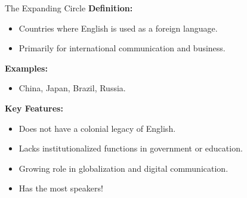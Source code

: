 \documentclass{beamer}
\begin{document}
\begin{frame}{The Expanding Circle}
\textbf{Definition:}
\begin{itemize}
    \item Countries where English is used as a foreign language.
    \item Primarily for international communication and business.
\end{itemize}

\textbf{Examples:}
\begin{itemize}
    \item China, Japan, Brazil, Russia.
\end{itemize}

\textbf{Key Features:}
\begin{itemize}
    \item Does not have a colonial legacy of English.
    \item Lacks institutionalized functions in government or education.
    \item Growing role in globalization and digital communication.
    \item Has the most speakers!
\end{itemize}

\end{frame}
\end{document}

